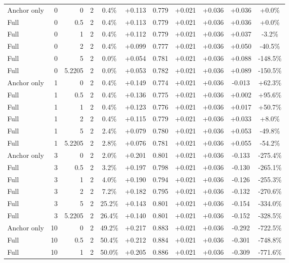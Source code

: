 \begin{table}[htbp]
\begin{tabular}{lrrrccccccc}
Anchor only & 0 & 0 & 2 & 0.4\% & +0.113 & 0.779 & +0.021 & +0.036 & +0.036 & +0.0\% \\
Full & 0 & 0.5 & 2 & 0.4\% & +0.113 & 0.779 & +0.021 & +0.036 & +0.036 & +0.0\% \\
Full & 0 & 1 & 2 & 0.4\% & +0.112 & 0.779 & +0.021 & +0.036 & +0.037 & -3.2\% \\
Full & 0 & 2 & 2 & 0.4\% & +0.099 & 0.777 & +0.021 & +0.036 & +0.050 & -40.5\% \\
Full & 0 & 5 & 2 & 0.0\% & +0.054 & 0.781 & +0.021 & +0.036 & +0.088 & -148.5\% \\
Full & 0 & 5.2205 & 2 & 0.0\% & +0.053 & 0.782 & +0.021 & +0.036 & +0.089 & -150.5\% \\
Anchor only & 1 & 0 & 2 & 0.4\% & +0.149 & 0.774 & +0.021 & +0.036 & -0.013 & +62.3\% \\
Full & 1 & 0.5 & 2 & 0.4\% & +0.136 & 0.775 & +0.021 & +0.036 & +0.002 & +95.6\% \\
Full & 1 & 1 & 2 & 0.4\% & +0.123 & 0.776 & +0.021 & +0.036 & +0.017 & +50.7\% \\
Full & 1 & 2 & 2 & 0.4\% & +0.115 & 0.779 & +0.021 & +0.036 & +0.033 & +8.0\% \\
Full & 1 & 5 & 2 & 2.4\% & +0.079 & 0.780 & +0.021 & +0.036 & +0.053 & -49.8\% \\
Full & 1 & 5.2205 & 2 & 2.8\% & +0.076 & 0.781 & +0.021 & +0.036 & +0.055 & -54.2\% \\
Anchor only & 3 & 0 & 2 & 2.0\% & +0.201 & 0.801 & +0.021 & +0.036 & -0.133 & -275.4\% \\
Full & 3 & 0.5 & 2 & 3.2\% & +0.197 & 0.798 & +0.021 & +0.036 & -0.130 & -265.1\% \\
Full & 3 & 1 & 2 & 4.0\% & +0.190 & 0.794 & +0.021 & +0.036 & -0.126 & -255.3\% \\
Full & 3 & 2 & 2 & 7.2\% & +0.182 & 0.795 & +0.021 & +0.036 & -0.132 & -270.6\% \\
Full & 3 & 5 & 2 & 25.2\% & +0.143 & 0.801 & +0.021 & +0.036 & -0.154 & -334.0\% \\
Full & 3 & 5.2205 & 2 & 26.4\% & +0.140 & 0.801 & +0.021 & +0.036 & -0.152 & -328.5\% \\
Anchor only & 10 & 0 & 2 & 49.2\% & +0.217 & 0.883 & +0.021 & +0.036 & -0.292 & -722.5\% \\
Full & 10 & 0.5 & 2 & 50.4\% & +0.212 & 0.884 & +0.021 & +0.036 & -0.301 & -748.8\% \\
Full & 10 & 1 & 2 & 50.0\% & +0.205 & 0.886 & +0.021 & +0.036 & -0.309 & -771.6\% \\

\end{tabular}
\end{table}
